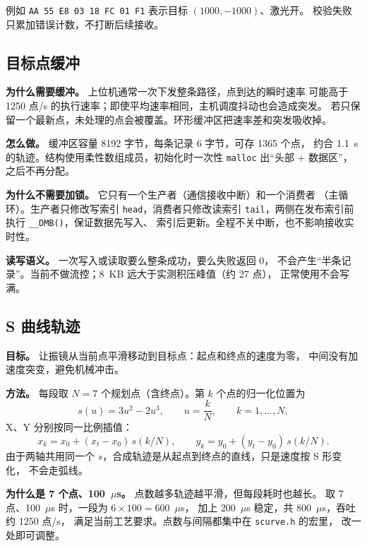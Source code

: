 \documentclass[UTF8,a4paper,11pt]{ctexart}
\begin{document}
例如 \texttt{AA 55 E8 03 18 FC 01 F1} 表示目标 $(1000,-1000)$、激光开。
校验失败只累加错误计数，不打断后续接收。

\subsection{目标点缓冲}

\textbf{为什么需要缓冲。} 上位机通常一次下发整条路径，点到达的瞬时速率
可能高于 1250 点/s 的执行速率；即使平均速率相同，主机调度抖动也会造成突发。
若只保留一个最新点，未处理的点会被覆盖。环形缓冲区把速率差和突发吸收掉。

\textbf{怎么做。} 缓冲区容量 8192 字节，每条记录 6 字节，可存 1365 个点，
约合 1.1~s 的轨迹。结构使用柔性数组成员，初始化时一次性
\texttt{malloc} 出“头部 + 数据区”，之后不再分配。

\textbf{为什么不需要加锁。} 它只有一个生产者（通信接收中断）和一个消费者
（主循环）。生产者只修改写索引 \texttt{head}，消费者只修改读索引
\texttt{tail}，两侧在发布索引前执行 \texttt{\_\_DMB()}，保证数据先写入、
索引后更新。全程不关中断，也不影响接收实时性。

\textbf{读写语义。} 一次写入或读取要么整条成功，要么失败返回 0，
不会产生“半条记录”。当前不做流控；8~KB 远大于实测积压峰值（约 27 点），
正常使用不会写满。

\subsection{S 曲线轨迹}

\textbf{目标。} 让振镜从当前点平滑移动到目标点：起点和终点的速度为零，
中间没有加速度突变，避免机械冲击。

\textbf{方法。} 每段取 $N=7$ 个规划点（含终点）。第 $k$ 个点的归一化位置为
\begin{equation}
  s(u)=3u^2-2u^3,\qquad u=\frac{k}{N},\qquad k=1,\dots,N,
\end{equation}
X、Y 分别按同一比例插值：
\begin{equation}
  x_k=x_0+(x_t-x_0)\,s(k/N),\qquad
  y_k=y_0+(y_t-y_0)\,s(k/N).
\end{equation}
由于两轴共用同一个 $s$，合成轨迹是从起点到终点的直线，只是速度按 S 形变化，
不会走弧线。

\textbf{为什么是 7 个点、100~$\mu$s。} 点数越多轨迹越平滑，但每段耗时也越长。
取 7 点、100~$\mu$s 时，一段为 $6\times100=600$~$\mu$s，
加上 200~$\mu$s 稳定，共 800~$\mu$s，吞吐约 1250 点/s，
满足当前工艺要求。点数与间隔都集中在 \texttt{scurve.h} 的宏里，
改一处即可调整。
\end{document}
